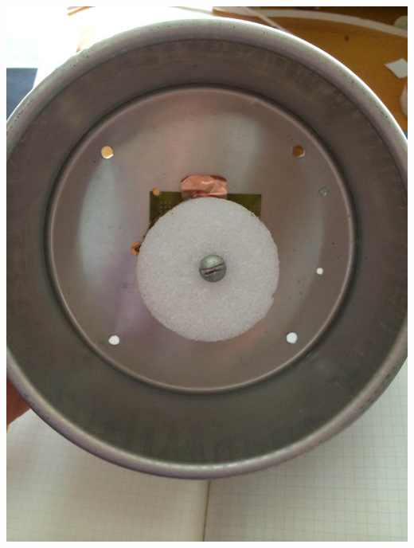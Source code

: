 \documentclass[11pt]{article} %
\begin{document}
\begin{center}
\includegraphics[scale=0.08]{feed/17.jpeg}
\end{center}
\end{document}
